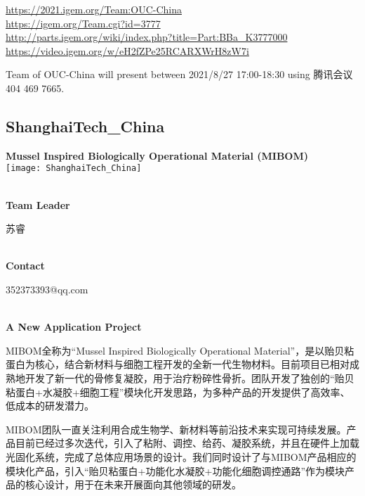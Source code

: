 \url{https://2021.igem.org/Team:OUC-China }\\
\url{https://igem.org/Team.cgi?id=3777 }\\
\url{http://parts.igem.org/wiki/index.php?title=Part:BBa_K3777000 }\\
\url{https://video.igem.org/w/eH2fZPe25RCARXWrH8zW7i }\\

\vfill{}









Team of OUC-China will present between   2021/8/27 17:00-18:30      using 腾讯会议 404 469 7665.
\newpage


\subsection{\textcolor{Blu}{ ShanghaiTech\_China } }
\vspace{5mm}
\begin{center}
\large{
  \textbf{ Mussel Inspired Biologically Operational Material (MIBOM) }\\
  \texttt{[image: ShanghaiTech\_China]}
}
\end{center}
\textbf{\\Team Leader}

  苏睿


\textbf{\\Contact}

  352373393@qq.com


\textbf{\\A New Application Project\\}\begin{spacing}{1.5}

MIBOM全称为“Mussel Inspired Biologically Operational Material”，是以贻贝粘蛋白为核心，结合新材料与细胞工程开发的全新一代生物材料。目前项目已相对成熟地开发了新一代的骨修复凝胶，用于治疗粉碎性骨折。团队开发了独创的“贻贝粘蛋白+水凝胶+细胞工程”模块化开发思路，为多种产品的开发提供了高效率、低成本的研发潜力。

MIBOM团队一直关注利用合成生物学、新材料等前沿技术来实现可持续发展。产品目前已经过多次迭代，引入了粘附、调控、给药、凝胶系统，并且在硬件上加载光固化系统，完成了总体应用场景的设计。我们同时设计了与MIBOM产品相应的模块化产品，引入“贻贝粘蛋白+功能化水凝胶+功能化细胞调控通路”作为模块产品的核心设计，用于在未来开展面向其他领域的研发。\end{spacing}
\\

